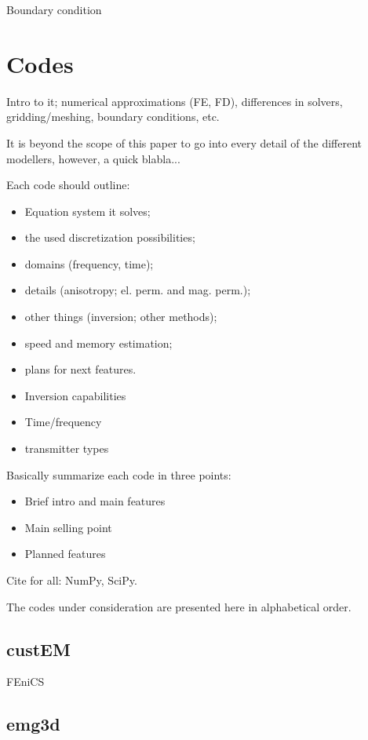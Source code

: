 \documentclass[
    paper,
  ]{geophysics}
\begin{document}
Boundary condition

\section{Codes}

Intro to it; numerical approximations (FE, FD), differences in solvers,
gridding/meshing, boundary conditions, etc.

It is beyond the scope of this paper to go into every detail of the different
modellers, however, a quick blabla...

Each code should outline:

\begin{itemize}
  \item Equation system it solves;
  \item the used discretization possibilities;
  \item domains (frequency, time);
  \item details (anisotropy; el. perm. and mag. perm.);
  \item other things (inversion; other methods);
  \item speed and memory estimation;
  \item plans for next features.
  \item Inversion capabilities
  \item Time/frequency
  \item transmitter types
\end{itemize}

Basically summarize each code in three points:
\begin{itemize}
  \item Brief intro and main features
  \item Main selling point
  \item Planned features
\end{itemize}

Cite for all: NumPy, SciPy.

The codes under consideration are presented here in alphabetical order.

\subsection{custEM}

\cite{GEO.19.Rochlitz}

FEniCS \citep{CSE.15.Alnaes}


\subsection{emg3d}
\end{document}
